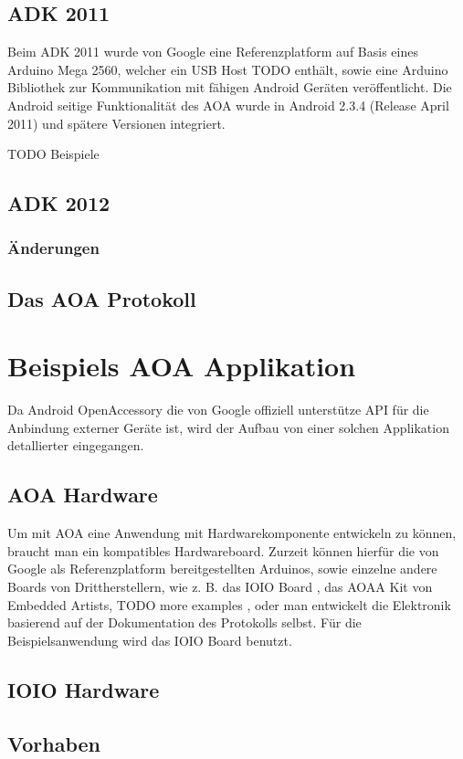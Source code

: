 \documentclass[12pt,journal,compsoc]{IEEEtran}
\begin{document}
\subsection{ADK 2011}
Beim ADK 2011 wurde von Google eine
Referenzplatform auf Basis eines Arduino Mega 2560, welcher ein USB Host TODO enthält, sowie eine Arduino Bibliothek zur Kommunikation mit fähigen Android Geräten veröffentlicht.
Die Android seitige Funktionalität des AOA wurde in Android 2.3.4 (Release April 2011) und spätere Versionen integriert. 

TODO Beispiele
\subsection{ADK 2012}
\subsubsection{Änderungen}

\subsection{Das AOA Protokoll}

\section{Beispiels AOA Applikation}
Da Android OpenAccessory die von Google offiziell unterstütze API für die Anbindung externer Geräte ist, wird der Aufbau von einer solchen Applikation detallierter eingegangen.
\subsection{AOA Hardware}
Um mit AOA eine Anwendung mit Hardwarekomponente entwickeln zu können, braucht man ein kompatibles Hardwareboard.
Zurzeit können hierfür die von Google als Referenzplatform bereitgestellten Arduinos, sowie einzelne andere Boards von Drittherstellern, wie z. B. das IOIO Board \cite{ioio}, das AOAA Kit von Embedded Artists\cite{aoaa},  TODO more examples , oder man entwickelt die Elektronik basierend auf der Dokumentation des Protokolls selbst.
Für die Beispielsanwendung wird das IOIO Board benutzt.
\subsection{IOIO Hardware}

\subsection{Vorhaben}
\end{document}
